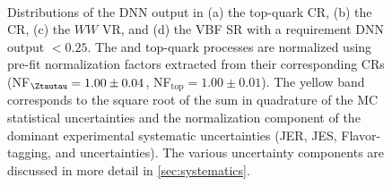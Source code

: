 \begin{figure}[ht]
{    }  \\
    {\caption[Distributions of the DNN output in various regions with a requirement of DNN output $<0.25$.]{Distributions of the DNN output in (a) the top-quark CR, (b) the \Ztautau CR, (c) the $WW$ VR, and (d) the VBF SR with a requirement DNN output $<0.25$. The \Ztautau and top-quark processes are normalized using pre-fit normalization factors extracted from their corresponding CRs (NF$_{\Ztautau} = 1.00 \pm 0.04$, NF$_{\text{top}} = 1.00 \pm 0.01$). The yellow band corresponds to the square root of the sum in quadrature of the MC statistical uncertainties and the normalization component of the dominant experimental systematic uncertainties (JER, JES, Flavor-tagging, and \MET uncertainties). The various uncertainty components are discussed in more detail in \cref{sec:systematics}.
            \label{fig:dnn:dnn-val-in-crs} }}
\end{figure}
